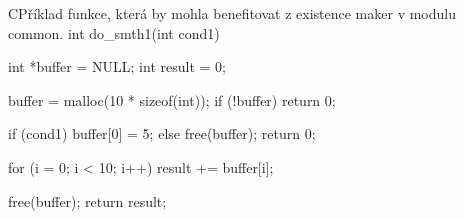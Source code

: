 \begin{code}{C}{Příklad funkce, která by mohla benefitovat z existence maker v modulu common.}
int do_smth1(int cond1){
  int *buffer = NULL;
  int result = 0;

  buffer = malloc(10 * sizeof(int));
  if (!buffer){
    return 0;
  }

  if (cond1){
    buffer[0] = 5;
  }else{
    free(buffer);
    return 0;
  }

  for (i = 0; i < 10; i++){
    result += buffer[i];
  }

  free(buffer);
  return result;
}
\end{code}
